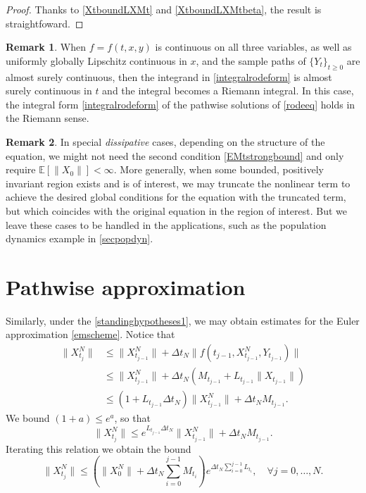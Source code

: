 \documentclass[reqno,12pt]{amsart}
\theoremstyle{plain} %
\theoremstyle{definition} %
\newtheorem{remark}{Remark}[section]
\begin{document}
\begin{proof}
    Thanks to \eqref{XtboundLXMt} and \eqref{XtboundLXMtbeta}, the result is straightfoward.
\end{proof}

\begin{remark}
    When $f=f(t, x, y)$ is continuous on all three variables, as well as uniformly globally Lipschitz continuous in $x$, and the sample paths of $\{Y_t\}_{t\geq 0}$ are almost surely continuous, then the integrand in \eqref{integralrodeform} is almost surely continuous in $t$ and the integral becomes a Riemann integral. In this case, the integral form \eqref{integralrodeform} of the pathwise solutions of \eqref{rodeeq} holds in the Riemann sense.
\end{remark}

\begin{remark}
    In special \emph{dissipative} cases, depending on the structure of the equation, we might not need the second condition \eqref{EMtstrongbound} and only require $\mathbb{E}[\|X_0\|] < \infty$. More generally, when some bounded, positively invariant region exists and is of interest, we may truncate the nonlinear term to achieve the desired global conditions for the equation with the truncated term, but which coincides with the original equation in the region of interest. But we leave these cases to be handled in the applications, such as the population dynamics example in \cref{secpopdyn}.
\end{remark}

\section{Pathwise approximation}
\label{secpathwiseapproximation}

Similarly, under the \cref{standinghypotheses1}, we may obtain estimates for the Euler approximation \eqref{emscheme}. Notice that
\begin{align*}
    \|X_{t_j}^N\| & \leq \|X_{t_{j-1}}^N\| + \Delta t_N \|f(t_{j-1}, X_{t_{j-1}}^N, Y_{t_{j-1}})\| \\
    & \leq \|X_{t_{j-1}}^N\| + \Delta t_N (M_{t_{j-1}} + L_{t_{j-1}}\|X_{t_{j-1}}\|) \\
    & \leq \left(1 + L_{t_{j-1}}\Delta t_N\right)\|X_{t_{j-1}}^N\| + \Delta t_N M_{t_{j-1}}.
\end{align*}
We bound $(1 + a) \leq e^a$, so that
\[
    \|X_{t_j}^N\| \leq e^{L_{t_{j-1}}\Delta t_N}\|X_{t_{j-1}}^N\| + \Delta t_N M_{t_{j-1}}.
\]
Iterating this relation we obtain the bound
\begin{equation}
    \label{XNtboundLXMt}
    \|X_{t_j}^N\| \leq \left(\|X_0^N\| + \Delta t_N \sum_{i=0}^{j-1} M_{t_i}\right)e^{\Delta t_N \sum_{i=0}^{j-1} L_{t_i}}, \quad \forall j = 0, \ldots, N.
\end{equation}
\end{document}
